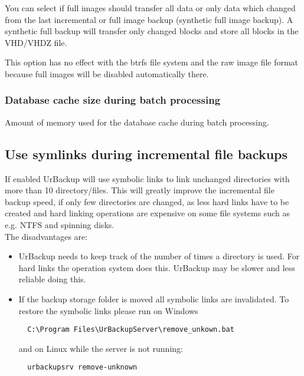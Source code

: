 \documentclass[a4paper,10pt]{article}
\begin{document}
You can select if full images should transfer all data or only data which changed from the last incremental or full image backup (synthetic full image backup). A synthetic full backup will transfer only changed blocks and store all blocks in the VHD/VHDZ file.

\par\null\par
This option has no effect with the btrfs file system and the raw image file format because full images will be disabled automatically there.

\subsubsection{Database cache size during batch processing}

Amount of memory used for the database cache during batch processing.

\subsection{Use symlinks during incremental file backups}

If enabled UrBackup will use symbolic links to link unchanged directories with more than 10 directory/files. This will greatly improve the incremental file backup speed, if only few directories are changed, as less hard links have to be created and hard linking operations are expensive on some file systems such as e.g. NTFS and spinning disks.\\

The disadvantages are:

\begin{itemize}
  \item UrBackup needs to keep track of the number of times a directory is used. For hard links the operation system does this. UrBackup may be slower and less reliable doing this.
  \item If the backup storage folder is moved all symbolic links are invalidated. To restore the symbolic links please run on Windows
  \begin{verbatim}
  C:\Program Files\UrBackupServer\remove_unkown.bat
  \end{verbatim}
  and on Linux while the server is not running:
  \begin{verbatim}
  urbackupsrv remove-unknown
  \end{verbatim}
  
\end{itemize}
\end{document}
